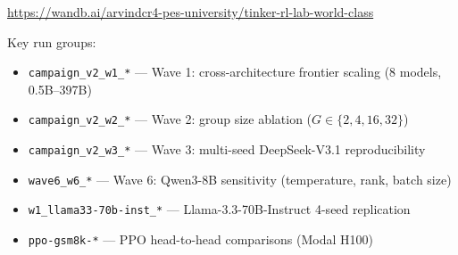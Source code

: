 \documentclass[12pt,a4paper]{report}
\theoremstyle{definition}
\begin{document}
\begin{center}
\url{https://wandb.ai/arvindcr4-pes-university/tinker-rl-lab-world-class}
\end{center}

Key run groups:
\begin{itemize}[nosep]
\item \texttt{campaign\_v2\_w1\_*} --- Wave 1: cross-architecture frontier scaling (8 models, 0.5B--397B)
\item \texttt{campaign\_v2\_w2\_*} --- Wave 2: group size ablation ($G \in \{2, 4, 16, 32\}$)
\item \texttt{campaign\_v2\_w3\_*} --- Wave 3: multi-seed DeepSeek-V3.1 reproducibility
\item \texttt{wave6\_w6\_*} --- Wave 6: Qwen3-8B sensitivity (temperature, rank, batch size)
\item \texttt{w1\_llama33-70b-inst\_*} --- Llama-3.3-70B-Instruct 4-seed replication
\item \texttt{ppo-gsm8k-*} --- PPO head-to-head comparisons (Modal H100)
\end{itemize}
\end{document}
